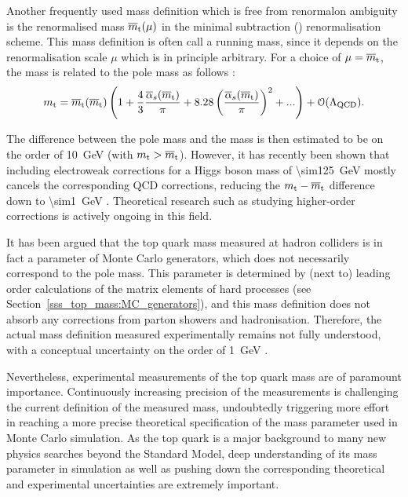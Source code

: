 Another frequently used mass definition which is free from renormalon ambiguity is the renormalised mass $\overline{m}_\mathrm{t}(\mu)$
in the minimal subtraction (\MS) renormalisation scheme. This mass definition is often call a running mass, since it
depends on the renormalisation scale $\mu$ which is in principle arbitrary. For a choice of $\mu=\overline{m}_\mathrm{t}$, the \MS mass
\MSmtop is related to the pole mass \mtop as follows
\autocite{top_pole_mass}:
\begin{equation}
m_\mathrm{t} = \overline{m}_\mathrm{t}(\overline{m}_\mathrm{t}) \left( 1 + \frac{4}{3} \frac{\overline{\alpha}_s(\overline{m}_\mathrm{t})}{\pi} + 8.28
\left(\frac{\overline{\alpha}_s(\overline{m}_\mathrm{t})}{\pi} \right)^2 + ... \right) + \mathcal{O}(\Lambda_\textrm{QCD}).
\end{equation}

The difference between the pole mass and the \MS mass is then estimated to be on the order of \SI{10}{\GeV} (with $m_\mathrm{t}
> \overline{m}_\mathrm{t}$). However, it has recently been shown that including electroweak corrections for a Higgs boson mass of
\SI{\sim125}{\GeV} mostly cancels the corresponding QCD corrections, reducing the $m_\mathrm{t}-\overline{m}_\mathrm{t}$ difference down to
\SI{\sim1}{\GeV} \autocite{pole_MS_top_difference}. Theoretical research such as studying higher-order corrections is
actively ongoing in this field.

It has been argued that the top quark mass measured at hadron colliders is in fact a parameter of Monte Carlo
generators, which does not necessarily correspond to the pole mass. This parameter is determined by (next to) leading
order calculations of the matrix elements of hard processes (see Section~\ref{sss_top_mass:MC_generators}), and this
mass definition does not absorb any corrections from parton showers and hadronisation. Therefore, the actual mass
definition measured experimentally remains not fully understood, with a conceptual uncertainty on the order of
\SI{1}{\GeV} \autocite{measured_top_mass_interpretation}.

Nevertheless, experimental measurements of the top quark mass are of paramount importance. Continuously increasing
precision of the measurements is challenging the current definition of the measured mass, undoubtedly triggering more
effort in reaching a more precise theoretical specification of the mass parameter used in Monte Carlo simulation. As the
top quark is a major background to many new physics searches beyond the Standard Model, deep understanding of its mass
parameter in simulation as well as pushing down the corresponding theoretical and experimental uncertainties are
extremely important.

